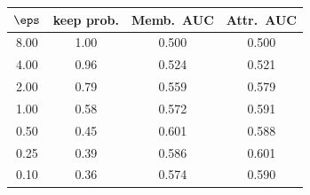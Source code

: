 {\setlength{\tabcolsep}{5pt}\renewcommand{\arraystretch}{1.15}
\begin{tabular}{@{}cccc@{}}
\toprule
$\eps$ & keep prob. & Memb.\ AUC & Attr.\ AUC \\
\midrule
8.00 & 1.00 & 0.500 & 0.500 \\
4.00 & 0.96 & 0.524 & 0.521 \\
2.00 & 0.79 & 0.559 & 0.579 \\
1.00 & 0.58 & 0.572 & 0.591 \\
0.50 & 0.45 & 0.601 & 0.588 \\
0.25 & 0.39 & 0.586 & 0.601 \\
0.10 & 0.36 & 0.574 & 0.590 \\
\bottomrule
\end{tabular}}
